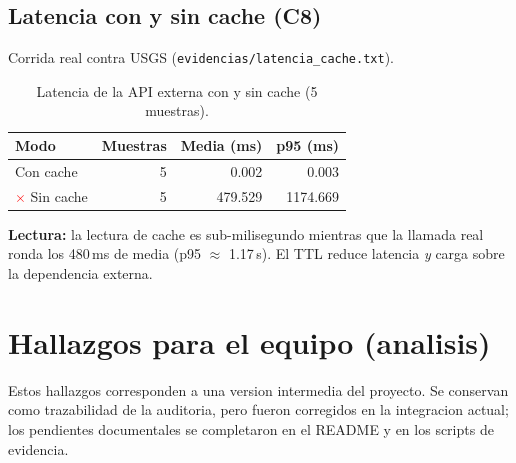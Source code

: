 \documentclass[11pt,a4paper]{article}
\newcommand{\arch}[1]{\texttt{#1}}
\newcommand{\ok}{\textcolor{verde}{\textbf{\checkmark}}}
\newcommand{\no}{\textcolor{red}{\textbf{$\times$}}}
\begin{document}
\subsection{Latencia con y sin cache (C8)}
Corrida real contra USGS (\arch{evidencias/latencia\_cache.txt}).

\begin{table}[H]
\centering
\begin{tabular}{l r r r}
\toprule
\textbf{Modo} & \textbf{Muestras} & \textbf{Media (ms)} & \textbf{p95 (ms)} \\
\midrule
\ok\; Con cache  & 5 & 0.002 & 0.003 \\
\no\; Sin cache  & 5 & 479.529 & 1174.669 \\
\bottomrule
\end{tabular}
\caption{Latencia de la API externa con y sin cache (5 muestras).}
\end{table}

\textbf{Lectura:} la lectura de cache es sub-milisegundo mientras que la
llamada real ronda los 480\,ms de media (p95 $\approx$ 1.17\,s). El TTL
reduce latencia \emph{y} carga sobre la dependencia externa.

\section{Hallazgos para el equipo (analisis)}

Estos hallazgos corresponden a una version intermedia del proyecto. Se
conservan como trazabilidad de la auditoria, pero fueron corregidos en la
integracion actual; los pendientes documentales se completaron en el README y
en los scripts de evidencia.
\end{document}
